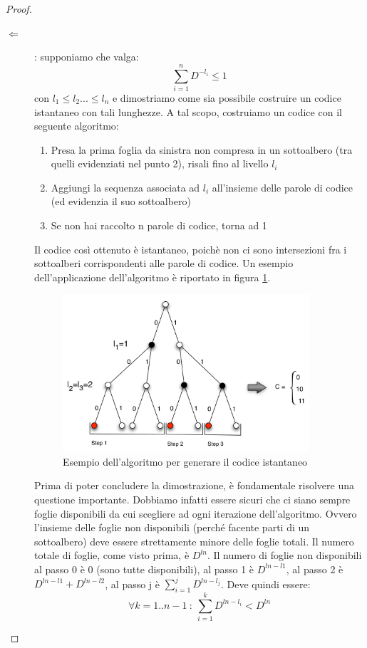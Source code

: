 \begin{teorema}
\begin{proof}
\begin{description}
\item[\(\Longleftarrow\)]: supponiamo che valga:
\[\sum_{i = 1}^n D^{-l_i} \leq 1\]
con \(l_1 \leq l_2 ... \leq l_n\) e dimostriamo come sia possibile costruire un codice istantaneo con tali lunghezze.
A tal scopo, costruiamo un codice con il seguente algoritmo:
\begin{enumerate}
\item Presa la prima foglia da sinistra non compresa in un sottoalbero (tra quelli evidenziati nel punto 2), risali fino al livello \(l_i\)
\item Aggiungi la sequenza associata ad \(l_i\) all'insieme delle parole di codice (ed evidenzia il suo sottoalbero)
\item Se non hai raccolto n parole di codice, torna ad 1
\end{enumerate}
Il codice così ottenuto è istantaneo, poichè non ci sono intersezioni fra i sottoalberi corrispondenti alle parole di codice. 
Un esempio dell'applicazione dell'algoritmo è riportato in figura \ref{fig:albero3}.

\begin{figure}[htbp]
\begin{center}
	\includegraphics[width=0.9\textwidth]{img/kraft3.pdf}
\caption{Esempio dell'algoritmo per generare il codice istantaneo}
\label{fig:albero3}
\end{center}
\end{figure}

Prima di poter concludere la dimostrazione, è fondamentale risolvere una questione importante. Dobbiamo infatti essere sicuri che ci siano sempre foglie disponibili da cui scegliere ad ogni iterazione dell'algoritmo.
Ovvero l'insieme delle foglie non disponibili (perché facente parti di un sottoalbero) deve essere strettamente 
minore delle foglie totali.
Il numero totale di foglie, come visto prima, è $D^{ln}$. Il numero di foglie non disponibili al passo 0 è 0 (sono tutte disponibili), al passo 1 è $D^{ln-l1}$, al passo 2 è $D^{ln-l1}+D^{ln-l2}$, al passo j è $\sum_{i = 1}^j D^{ln-l_j}$.
Deve quindi essere:
\[
 \forall k=1..n-1 \ : \ \sum_{i = 1}^k D^{ln-l_i} < D^{ln} 
\]


\end{description}
\end{proof}
\end{teorema}
